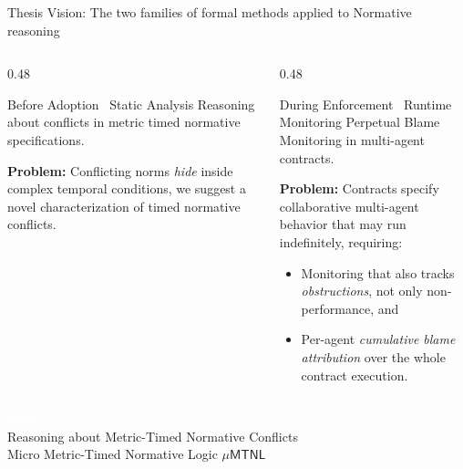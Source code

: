 \documentclass[9pt,aspectratio=169]{beamer}
\newcommand{\logic}[1]{\ensuremath{\mathsf{#1}}\xspace}
\newcommand{\TDDLfm}{\logic{\mu MTNL}}
\begin{document}
\begin{frame}{Thesis Vision: The two families of formal methods applied to Normative reasoning}

\centering
{}
\vspace{4mm}
\begin{columns}[T]
  \begin{column}{0.48\textwidth}
    \begin{block}{Before Adoption \textemdash\ Static Analysis}
      \small
      Reasoning about conflicts in metric timed normative specifications.
    \medskip

      \textbf{Problem:}  Conflicting norms \emph{hide} inside complex temporal conditions, we suggest a novel characterization of timed normative conflicts.
    \end{block}
  \end{column}
  \begin{column}{0.48\textwidth}
    \begin{block}{During Enforcement \textemdash\ Runtime Monitoring}
      \small
     Perpetual Blame Monitoring  in multi-agent contracts.
      
      \medskip

      \textbf{Problem:}  Contracts specify collaborative multi-agent behavior that may run indefinitely, requiring:
      \begin{itemize}\setlength\itemsep{1pt}
        \item Monitoring that also tracks \emph{obstructions}, not only non-performance, and
        \item Per-agent \emph{cumulative blame attribution}  over the whole contract execution.
      \end{itemize}
    \end{block}
  \end{column}
\end{columns}
\end{frame}

{
\begin{frame}[plain]
  \vfill
  \centering
  \textcolor{white}{\Huge\bfseries Part I}\\[6mm]
  \textcolor{white!85}{\Large Reasoning about Metric-Timed Normative Conflicts }\\[3mm]
  \textcolor{white!70}{\large Micro Metric-Timed Normative Logic $\TDDLfm$}
  \vfill
\end{frame}
}
\end{document}
